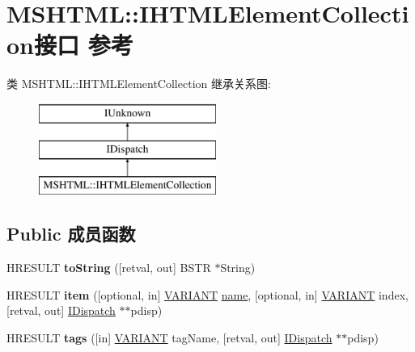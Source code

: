 \hypertarget{interface_m_s_h_t_m_l_1_1_i_h_t_m_l_element_collection}{}\section{M\+S\+H\+T\+ML\+:\+:I\+H\+T\+M\+L\+Element\+Collection接口 参考}
\label{interface_m_s_h_t_m_l_1_1_i_h_t_m_l_element_collection}
类 M\+S\+H\+T\+ML\+:\+:I\+H\+T\+M\+L\+Element\+Collection 继承关系图\+:\begin{figure}[H]
\begin{center}
\leavevmode
\includegraphics[height=3.000000cm]{interface_m_s_h_t_m_l_1_1_i_h_t_m_l_element_collection}
\end{center}
\end{figure}
\subsection*{Public 成员函数}
\begin{DoxyCompactItemize}
\item 
\mbox{\label{interface_m_s_h_t_m_l_1_1_i_h_t_m_l_element_collection_a053dd3e532d393440102efb6b5214f92}} 
H\+R\+E\+S\+U\+LT {\bfseries to\+String} (\mbox{[}retval, out\mbox{]} B\+S\+TR $\ast$String)
\item 
\mbox{\label{interface_m_s_h_t_m_l_1_1_i_h_t_m_l_element_collection_adf1ca53020f05b23bc45087fc01a6302}} 
H\+R\+E\+S\+U\+LT {\bfseries item} (\mbox{[}optional, in\mbox{]} \hyperlink{structtag_v_a_r_i_a_n_t}{V\+A\+R\+I\+A\+NT} \hyperlink{structname}{name}, \mbox{[}optional, in\mbox{]} \hyperlink{structtag_v_a_r_i_a_n_t}{V\+A\+R\+I\+A\+NT} index, \mbox{[}retval, out\mbox{]} \hyperlink{interface_i_dispatch}{I\+Dispatch} $\ast$$\ast$pdisp)
\item 
\mbox{\label{interface_m_s_h_t_m_l_1_1_i_h_t_m_l_element_collection_a0835d41002dc02db16082997e8c39f2f}} 
H\+R\+E\+S\+U\+LT {\bfseries tags} (\mbox{[}in\mbox{]} \hyperlink{structtag_v_a_r_i_a_n_t}{V\+A\+R\+I\+A\+NT} tag\+Name, \mbox{[}retval, out\mbox{]} \hyperlink{interface_i_dispatch}{I\+Dispatch} $\ast$$\ast$pdisp)
\end{DoxyCompactItemize}
